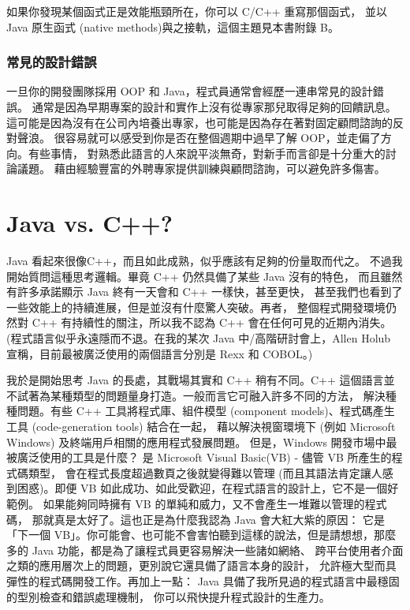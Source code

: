 如果你發現某個函式正是效能瓶頸所在，你可以 C/C++ 重寫那個函式，
並以 Java 原生函式 (native methods)與之接軌，這個主題見本書附錄 B。
\subsubsection{常見的設計錯誤}
一旦你的開發團隊採用 OOP 和 Java，程式員通常會經歷一連串常見的設計錯誤。
通常是因為早期專案的設計和實作上沒有從專家那兒取得足夠的回饋訊息。
這可能是因為沒有在公司內培養出專家，也可能是因為存在著對固定顧問諮詢的反對聲浪。
很容易就可以感受到你是否在整個週期中過早了解 OOP，並走偏了方向。有些事情，
對熟悉此語言的人來說平淡無奇，對新手而言卻是十分重大的討論議題。
藉由經驗豐富的外聘專家提供訓練與顧問諮詢，可以避免許多傷害。

\section{Java vs. C++?}
Java 看起來很像C++，而且如此成熟，似乎應該有足夠的份量取而代之。
不過我開始質問這種思考邏輯。畢竟 C++ 仍然具備了某些 Java 沒有的特色，
而且雖然有許多承諾顯示 Java 終有一天會和 C++ 一樣快，甚至更快，
甚至我們也看到了一些效能上的持續進展，但是並沒有什麼驚人突破。再者，
整個程式開發環境仍然對 C++ 有持續性的關注，所以我不認為 C++
會在任何可見的近期內消失。 (程式語言似乎永遠隱而不退。在我的某次
Java 中/高階研討會上，Allen Holub 宣稱，目前最被廣泛使用的兩個語言分別是
Rexx 和 COBOL。)

我於是開始思考 Java 的長處，其戰場其實和 C++ 稍有不同。C++
這個語言並不試著為某種類型的問題量身打造。一般而言它可融入許多不同的方法，
解決種種問題。有些 C++ 工具將程式庫、組件模型
(component models)、程式碼產生工具 (code-generation tools) 結合在一起，
藉以解決視窗環境下 (例如 Microsoft Windows) 及終端用戶相關的應用程式發展問題。
但是，Windows 開發市場中最被廣泛使用的工具是什麼？ 是
Microsoft Visual Basic(VB) - 儘管 VB 所產生的程式碼類型，
會在程式長度超過數頁之後就變得難以管理
(而且其語法肯定讓人感到困惑)。即便
VB 如此成功、如此受歡迎，在程式語言的設計上，它不是一個好範例。
如果能夠同時擁有 VB 的單純和威力，又不會產生一堆難以管理的程式碼，
那就真是太好了。這也正是為什麼我認為 Java 會大紅大紫的原因：
它是「下一個 VB」。你可能會、也可能不會害怕聽到這樣的說法，但是請想想，那麼多的
Java 功能，都是為了讓程式員更容易解決一些諸如網絡、
跨平台使用者介面之類的應用層次上的問題，更別說它還具備了語言本身的設計，
允許極大型而具彈性的程式碼開發工作。再加上一點： Java
具備了我所見過的程式語言中最穩固的型別檢查和錯誤處理機制，
你可以飛快提升程式設計的生產力。

